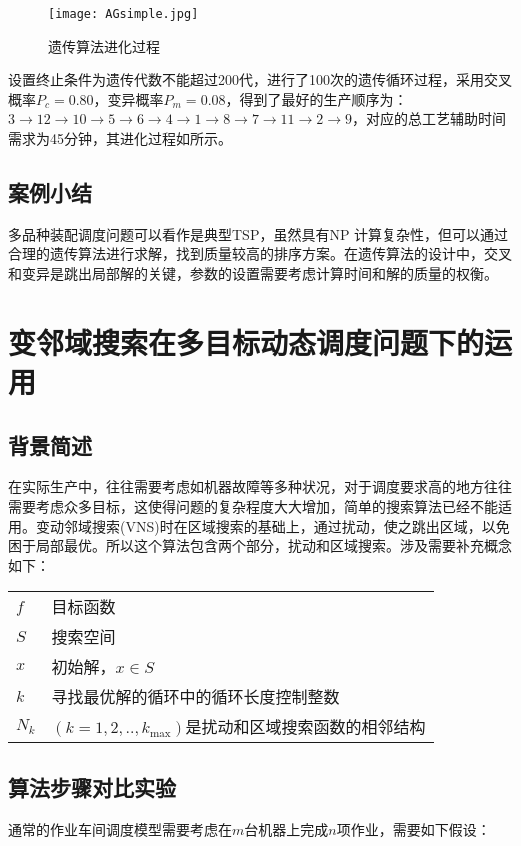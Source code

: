 \begin{figure}[h]
\centering
\texttt{[image: AGsimple.jpg]}
\caption{遗传算法进化过程\label{fig:AGsimple}}
\end{figure}

设置终止条件为遗传代数不能超过200代，进行了100次的遗传循环过程，采用交叉概率$P_c = 0.80$，变异概率$P_m = 0.08$，得到了最好的生产顺序为：$3\rightarrow12\rightarrow10\rightarrow5\rightarrow6\rightarrow4\rightarrow1\rightarrow8\rightarrow7\rightarrow11\rightarrow2\rightarrow9$，对应的总工艺辅助时间需求为45分钟，其进化过程如所示。

\subsection{案例小结}
多品种装配调度问题可以看作是典型TSP，虽然具有NP 计算复杂性，但可以通过合理的遗传算法进行求解，找到质量较高的排序方案。在遗传算法的设计中，交叉和变异是跳出局部解的关键，参数的设置需要考虑计算时间和解的质量的权衡。

\section{变邻域搜索在多目标动态调度问题下的运用}
\subsection{背景简述}
在实际生产中，往往需要考虑如机器故障等多种状况，对于调度要求高的地方往往需要考虑众多目标，这使得问题的复杂程度大大增加，简单的搜索算法已经不能适用。变动邻域搜索(VNS)时在区域搜索的基础上，通过扰动，使之跳出区域，以免困于局部最优。所以这个算法包含两个部分，扰动和区域搜索。涉及需要补充概念如下：

\begin{tabular}{ll}
$f$ & 目标函数\\
$S$ & 搜索空间 \\
$x$ & 初始解，$x\in S$\\
$k$ & 寻找最优解的循环中的循环长度控制整数\\
$N_k$ & $(k = 1,2,..,k_{\max})$是扰动和区域搜索函数的相邻结构
\end{tabular}

\subsection{算法步骤对比实验}
通常的作业车间调度模型需要考虑在$m$台机器上完成$n$项作业，需要如下假设：

